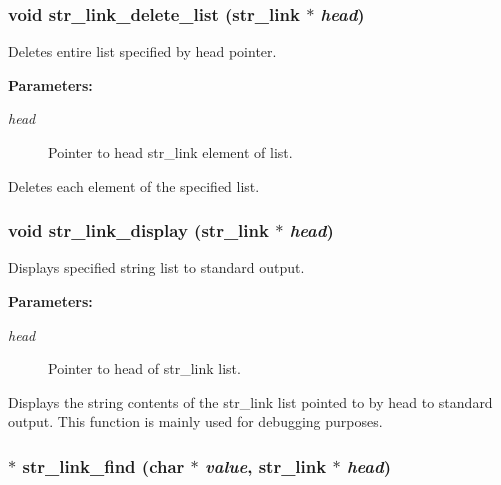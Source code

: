 \subsubsection{\setlength{\rightskip}{0pt plus 5cm}void str\_\-link\_\-delete\_\-list ({\bf str\_\-link} $\ast$ {\em head})}\label{link_8h_a18}


Deletes entire list specified by head pointer.

\begin{Desc}
\item[{\bf Parameters: }]\par
\begin{description}
\item[
{\em head}]Pointer to head str\_\-link element of list.

\end{description}
\end{Desc}
Deletes each element of the specified list. 
\subsubsection{\setlength{\rightskip}{0pt plus 5cm}void str\_\-link\_\-display ({\bf str\_\-link} $\ast$ {\em head})}\label{link_8h_a6}


Displays specified string list to standard output.

\begin{Desc}
\item[{\bf Parameters: }]\par
\begin{description}
\item[
{\em head}]Pointer to head of str\_\-link list.

\end{description}
\end{Desc}
Displays the string contents of the str\_\-link list pointed to by head to standard output. This function is mainly used for debugging purposes. 
\subsubsection{$\ast$ str\_\-link\_\-find (char $\ast$ {\em value}, {\bf str\_\-link} $\ast$ {\em head})}\label{link_8h_a11}


